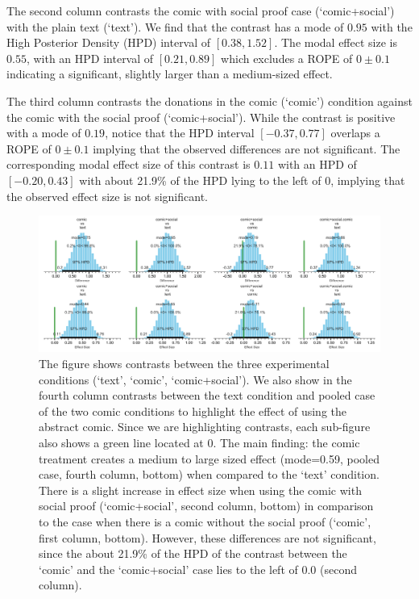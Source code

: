 The second column contrasts the comic with social proof case (`comic+social') with the plain text (`text'). We find that the contrast has a mode of $0.95$ with the High Posterior Density (HPD) interval of $[0.38, 1.52]$. The modal effect size is $0.55$, with an HPD interval of $[0.21, 0.89]$ which excludes a ROPE of $0 \pm 0.1$ indicating a significant, slightly larger than a medium-sized effect.

The third column contrasts the donations in the comic (`comic') condition against the comic with the social proof (`comic+social'). While the contrast is positive with a mode of $0.19$, notice that the HPD interval $[-0.37, 0.77]$ overlaps a ROPE of $0 \pm 0.1$ implying that the observed differences are not significant. The corresponding modal effect size of this contrast is $0.11$ with an HPD of $[-0.20, 0.43]$ with about 21.9\% of the HPD lying to the left of 0, implying that the observed effect size is not significant.


\begin{figure}[htb]
	\includegraphics[width=1\textwidth]{./figures/robust_contrasts_font_fixed.pdf}
    \caption{The figure shows contrasts between the three experimental conditions (`text', `comic', `comic+social'). We also show in the fourth column contrasts between the text condition and pooled case of the two comic conditions to highlight the effect of using the abstract comic. Since we are highlighting contrasts, each sub-figure also shows a green line located at 0. The main finding: the comic treatment creates a medium to large sized effect (mode=0.59, pooled case, fourth column, bottom) when compared to the `text' condition. There is a slight increase in effect size when using the comic with social proof (`comic+social', second column, bottom) in comparison to the case when there is a comic without the social proof (`comic', first column, bottom). However, these differences are not significant, since the about 21.9\% of the HPD of the contrast between the `comic' and the `comic+social' case lies to the left of 0.0 (second column). }
	\label{fig:robustcontrasts}
\end{figure}


